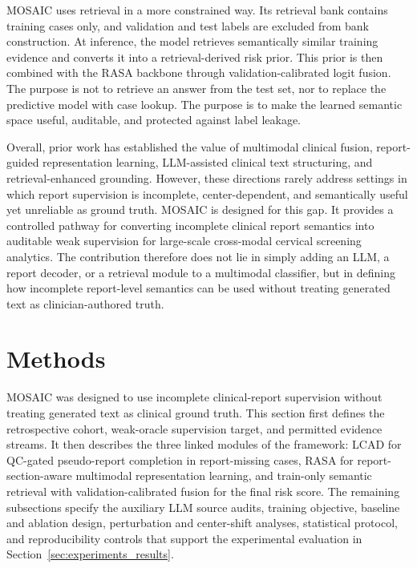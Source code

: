 \documentclass[11pt, a4paper]{article}
\theoremstyle{plain}
\theoremstyle{definition}
\begin{document}
MOSAIC uses retrieval in a more constrained way. Its retrieval bank contains training cases only, and validation and test labels are excluded from bank construction. At inference, the model retrieves semantically similar training evidence and converts it into a retrieval-derived risk prior. This prior is then combined with the RASA backbone through validation-calibrated logit fusion. The purpose is not to retrieve an answer from the test set, nor to replace the predictive model with case lookup. The purpose is to make the learned semantic space useful, auditable, and protected against label leakage.

Overall, prior work has established the value of multimodal clinical fusion, report-guided representation learning, LLM-assisted clinical text structuring, and retrieval-enhanced grounding. However, these directions rarely address settings in which report supervision is incomplete, center-dependent, and semantically useful yet unreliable as ground truth. MOSAIC is designed for this gap. It provides a controlled pathway for converting incomplete clinical report semantics into auditable weak supervision for large-scale cross-modal cervical screening analytics. The contribution therefore does not lie in simply adding an LLM, a report decoder, or a retrieval module to a multimodal classifier, but in defining how incomplete report-level semantics can be used without treating generated text as clinician-authored truth.







\section{Methods}
\label{sec:methods}

MOSAIC was designed to use incomplete clinical-report supervision without treating generated text as clinical ground truth. This section first defines the retrospective cohort, weak-oracle supervision target, and permitted evidence streams. It then describes the three linked modules of the framework: LCAD for QC-gated pseudo-report completion in report-missing cases, RASA for report-section-aware multimodal representation learning, and train-only semantic retrieval with validation-calibrated fusion for the final risk score. The remaining subsections specify the auxiliary LLM source audits, training objective, baseline and ablation design, perturbation and center-shift analyses, statistical protocol, and reproducibility controls that support the experimental evaluation in Section~\ref{sec:experiments_results}.
\end{document}

